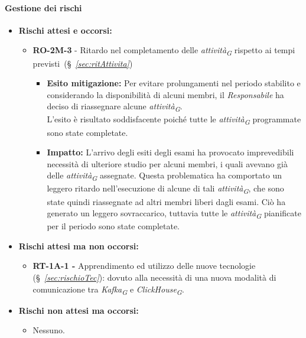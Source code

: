 \paragraph{Gestione dei rischi} 

\begin{itemize}
    \item \textbf{Rischi attesi e occorsi:}
\begin{itemize}
    \item \textbf{RO-2M-3} - Ritardo nel completamento delle \textit{attività}\textsubscript{\textit{G}} rispetto ai tempi previsti~(\S~\textit{\ref{sec:ritAttivita}})
    \begin{itemize}
        \item \textbf{Esito mitigazione:} 
        Per evitare prolungamenti nel periodo stabilito e considerando la disponibilità di alcuni membri, il \textit{Responsabile} ha deciso di riassegnare alcune \textit{attività}\textsubscript{\textit{G}}. \\
        L'esito è risultato soddisfacente poiché tutte le \textit{attività}\textsubscript{\textit{G}} programmate sono state completate.
        \item \textbf{Impatto:}
        L'arrivo degli esiti degli esami ha provocato imprevedibili necessità di ulteriore studio per alcuni membri, i quali avevano già delle \textit{attività}\textsubscript{\textit{G}} assegnate. Questa problematica ha comportato un leggero ritardo nell'esecuzione di alcune di tali \textit{attività}\textsubscript{\textit{G}}, che sono state quindi riassegnate ad altri membri liberi dagli esami. Ciò ha generato un leggero sovraccarico, tuttavia tutte le \textit{attività}\textsubscript{\textit{G}} pianificate per il periodo sono state completate.
    \end{itemize}
\end{itemize}
\item \textbf{Rischi attesi ma non occorsi:}
 \begin{itemize}
    \item  \textbf{RT-1A-1 -} Apprendimento ed utilizzo delle nuove tecnologie (\S~\textit{\ref{sec:rischioTec}}): dovuto alla necessità di una nuova modalità di comunicazione tra \textit{Kafka}\textsubscript{\textit{G}} e \textit{ClickHouse}\textsubscript{\textit{G}}.
\end{itemize}
\item \textbf{Rischi non attesi ma occorsi:}
\begin{itemize}
    \item Nessuno.
\end{itemize}
\end{itemize}

